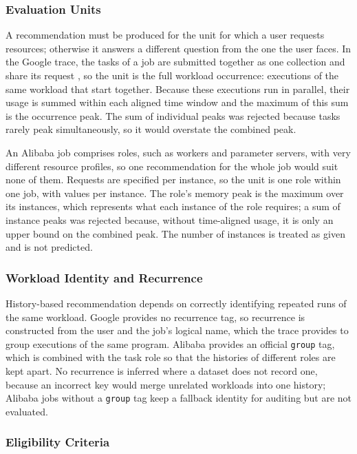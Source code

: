 \documentclass{IEEEtran}
\begin{document}
\subsubsection{Evaluation Units}\label{sec:4.1.4}

A recommendation must be produced for the unit for which a user requests resources; otherwise it answers a different question from the one the user faces. In the Google trace, the tasks of a job are submitted together as one collection and share its request \cite{ref7}, so the unit is the full workload occurrence: executions of the same workload that start together. Because these executions run in parallel, their usage is summed within each aligned time window and the maximum of this sum is the occurrence peak. The sum of individual peaks was rejected because tasks rarely peak simultaneously, so it would overstate the combined peak.

An Alibaba job comprises roles, such as workers and parameter servers, with very different resource profiles, so one recommendation for the whole job would suit none of them. Requests are specified per instance, so the unit is one role within one job, with values per instance. The role's memory peak is the maximum over its instances, which represents what each instance of the role requires; a sum of instance peaks was rejected because, without time-aligned usage, it is only an upper bound on the combined peak. The number of instances is treated as given and is not predicted.

\subsubsection{Workload Identity and Recurrence}\label{sec:4.1.5}

History-based recommendation depends on correctly identifying repeated runs of the same workload. Google provides no recurrence tag, so recurrence is constructed from the user and the job's logical name, which the trace provides to group executions of the same program. Alibaba provides an official \texttt{group} tag, which is combined with the task role so that the histories of different roles are kept apart. No recurrence is inferred where a dataset does not record one, because an incorrect key would merge unrelated workloads into one history; Alibaba jobs without a \texttt{group} tag keep a fallback identity for auditing but are not evaluated.

\subsubsection{Eligibility Criteria}\label{sec:4.1.6}
\end{document}
